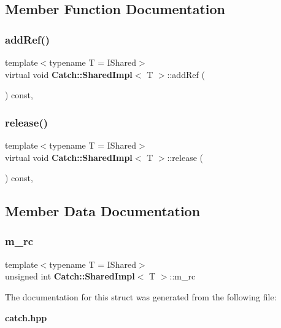 \subsection{Member Function Documentation}
\mbox{\label{struct_catch_1_1_shared_impl_a5d1a4c96e8fc07c821890fd09749062e}} 
\subsubsection{add\+Ref()}
{\footnotesize\ttfamily template$<$typename T = I\+Shared$>$ \\
virtual void \textbf{ Catch\+::\+Shared\+Impl}$<$ T $>$\+::add\+Ref (\begin{DoxyParamCaption}{ }\end{DoxyParamCaption}) const\hspace{0.3cm}{\ttfamily [inline]}, {\ttfamily [virtual]}}

\mbox{\label{struct_catch_1_1_shared_impl_ada8052c6f24fd73ec099333626f106fe}} 
\subsubsection{release()}
{\footnotesize\ttfamily template$<$typename T = I\+Shared$>$ \\
virtual void \textbf{ Catch\+::\+Shared\+Impl}$<$ T $>$\+::release (\begin{DoxyParamCaption}{ }\end{DoxyParamCaption}) const\hspace{0.3cm}{\ttfamily [inline]}, {\ttfamily [virtual]}}



\subsection{Member Data Documentation}
\mbox{\label{struct_catch_1_1_shared_impl_a7e71ef1985b85aa41a1632f932a96bcb}} 
\subsubsection{m\+\_\+rc}
{\footnotesize\ttfamily template$<$typename T = I\+Shared$>$ \\
unsigned int \textbf{ Catch\+::\+Shared\+Impl}$<$ T $>$\+::m\+\_\+rc\hspace{0.3cm}{\ttfamily [mutable]}}



The documentation for this struct was generated from the following file\+:\begin{DoxyCompactItemize}
\item 
\textbf{ catch.\+hpp}\end{DoxyCompactItemize}
